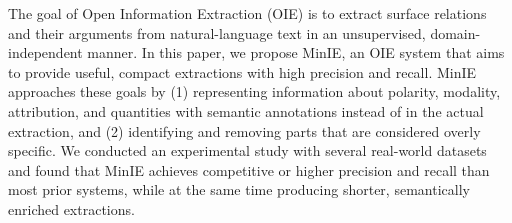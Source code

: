 The goal of Open Information Extraction (OIE) is to extract surface relations and their arguments from natural-language text in an unsupervised, domain-independent manner. In this paper, we propose MinIE, an OIE system that aims to provide useful, compact extractions with high precision and recall. MinIE approaches these goals by (1) representing information about polarity, modality, attribution, and quantities with semantic annotations instead of in the actual extraction, and (2) identifying and removing parts that are considered overly specific. We conducted an experimental study with several real-world datasets and found that MinIE achieves competitive or higher precision and recall than most prior systems, while at the same time producing shorter, semantically enriched extractions.
